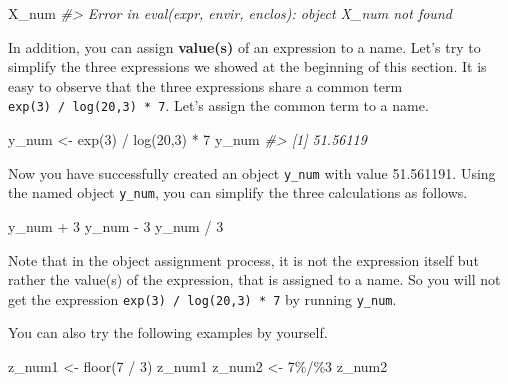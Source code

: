 \documentclass[
]{book}
\newenvironment{Shaded}{\begin{snugshade}}{\end{snugshade}}
\newcommand{\CommentTok}[1]{\textcolor[rgb]{0.56,0.35,0.01}{\textit{#1}}}
\newcommand{\DecValTok}[1]{\textcolor[rgb]{0.00,0.00,0.81}{#1}}
\newcommand{\FunctionTok}[1]{\textcolor[rgb]{0.00,0.00,0.00}{#1}}
\newcommand{\NormalTok}[1]{#1}
\newcommand{\OtherTok}[1]{\textcolor[rgb]{0.56,0.35,0.01}{#1}}
\newcommand{\SpecialCharTok}[1]{\textcolor[rgb]{0.00,0.00,0.00}{#1}}
\newenvironment{blackbox}{
  \definecolor{shadecolor}{rgb}{0, 0, 0}  %
  \color{white}
  \begin{shaded}}
 {\end{shaded}}
\newenvironment{infobox}[1]
  {
  \begin{itemize}
  \renewcommand{\labelitemi}{
    \raisebox{-.7\height}[0pt][0pt]{
      {\setkeys{Gin}{width=3em,keepaspectratio}
        \texttt{[image: pics/\#1]}}
    }
  }
  \setlength{\fboxsep}{1em}
  \begin{blackbox}
  \item
  }
  {
  \end{blackbox}
  \end{itemize}
  }
\begin{document}
\begin{Shaded}
\begin{Highlighting}[]
\NormalTok{X\_num}
\CommentTok{\#\textgreater{} Error in eval(expr, envir, enclos): object \textquotesingle{}X\_num\textquotesingle{} not found}
\end{Highlighting}
\end{Shaded}

In addition, you can assign \textbf{value(s)} of an expression to a name. Let's try to simplify the three expressions we showed at the beginning of this section. It is easy to observe that the three expressions share a common term \texttt{exp(3)\ /\ log(20,3)\ *\ 7}. Let's assign the common term to a name.

\begin{Shaded}
\begin{Highlighting}[]
\NormalTok{y\_num }\OtherTok{\textless{}{-}} \FunctionTok{exp}\NormalTok{(}\DecValTok{3}\NormalTok{) }\SpecialCharTok{/} \FunctionTok{log}\NormalTok{(}\DecValTok{20}\NormalTok{,}\DecValTok{3}\NormalTok{) }\SpecialCharTok{*} \DecValTok{7}
\NormalTok{y\_num}
\CommentTok{\#\textgreater{} [1] 51.56119}
\end{Highlighting}
\end{Shaded}

Now you have successfully created an object \texttt{y\_num} with value 51.561191. Using the named object \texttt{y\_num}, you can simplify the three calculations as follows.

\begin{Shaded}
\begin{Highlighting}[]
\NormalTok{y\_num }\SpecialCharTok{+} \DecValTok{3}
\NormalTok{y\_num }\SpecialCharTok{{-}} \DecValTok{3}
\NormalTok{y\_num }\SpecialCharTok{/} \DecValTok{3}
\end{Highlighting}
\end{Shaded}

\begin{infobox}{caution}
Note that in the object assignment process, it is not the expression itself but rather the value(s) of the expression, that is assigned to a name. So you will not get the expression \texttt{exp(3)\ /\ log(20,3)\ *\ 7} by running \texttt{y\_num}.

\end{infobox}

You can also try the following examples by yourself.

\begin{Shaded}
\begin{Highlighting}[]
\NormalTok{z\_num1 }\OtherTok{\textless{}{-}} \FunctionTok{floor}\NormalTok{(}\DecValTok{7} \SpecialCharTok{/} \DecValTok{3}\NormalTok{) }
\NormalTok{z\_num1}
\NormalTok{z\_num2 }\OtherTok{\textless{}{-}} \DecValTok{7}\SpecialCharTok{\%/\%}\DecValTok{3}
\NormalTok{z\_num2}
\end{Highlighting}
\end{Shaded}
\end{document}
